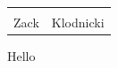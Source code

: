 \documentclass{article}
\begin{document}
\begin{tabular}{|c|c|}
    \hline \\
Zack & Klodnicki \\
    \hline
\end{tabular}

Hello
\end{document}

